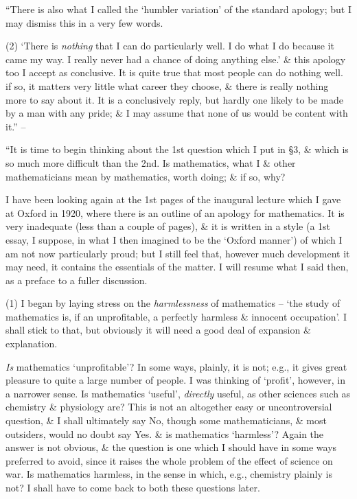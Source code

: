 \documentclass{article}
\numberwithin{equation}{section}
\begin{document}
 ``There is also what I called the `humbler variation' of the standard apology; but I may dismiss this in a very few words.

(2) `There is \textit{nothing} that I can do particularly well. I do what I do because it came my way. I really never had a chance of doing anything else.' \& this apology too I accept as conclusive. It is quite true that most people can do nothing well. if so, it matters very little what career they choose, \& there is really nothing more to say about it. It is a conclusively reply, but hardly one likely to be made by a man with any pride; \& I may assume that none of us would be content with it.'' -- \cite[p. 73]{Hardy1992}

 ``It is time to begin thinking about the 1st question which I put in \S3, \& which is so much more difficult than the 2nd. Is mathematics, what I \& other mathematicians mean by mathematics, worth doing; \& if so, why?

I have been looking again at the 1st pages of the inaugural lecture which I gave at Oxford in 1920, where there is an outline of an apology for mathematics. It is very inadequate (less than a couple of pages), \& it is written in a style (a 1st essay, I suppose, in what I then imagined to be the `Oxford manner') of which I am not now particularly proud; but I still feel that, however much development it may need, it contains the essentials of the matter. I will resume what I said then, as a preface to a fuller discussion.

(1) I began by laying stress on the \textit{harmlessness} of mathematics -- `the study of mathematics is, if an unprofitable, a perfectly harmless \& innocent occupation'. I shall stick to that, but obviously it will need a good deal of expansion \& explanation.

\textit{Is} mathematics `unprofitable'? In some ways, plainly, it is not; e.g., it gives great pleasure to quite a large number of people. I was thinking of `profit', however, in a narrower sense. Is mathematics `useful', \textit{directly} useful, as other sciences such as chemistry \& physiology are? This is not an altogether easy or uncontroversial question, \& I shall ultimately say No, though some mathematicians, \& most outsiders, would no doubt say Yes. \& is mathematics `harmless'? Again the answer is not obvious, \& the question is one which I should have in some ways preferred to avoid, since it raises the whole problem of the effect of science on war. Is mathematics harmless, in the sense in which, e.g., chemistry plainly is not? I shall have to come back to both these questions later.
\end{document}
